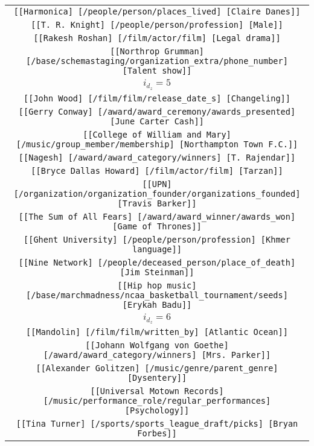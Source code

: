 \begin{longtable}{|c|}
    \texttt{[[Harmonica] [/people/person/places\_lived] [Claire Danes]]}\\
    \texttt{[[T. R. Knight] [/people/person/profession] [Male]]}\\
    \texttt{[[Rakesh Roshan] [/film/actor/film] [Legal drama]]}\\
    \texttt{[[Northrop Grumman] [/base/schemastaging/organization\_extra/phone\_number] [Talent show]]}\\
    \hline 
    \rowcolor[HTML]{EFEFEF} 
    \textsc{$i_{d_z}=5$}\\ \hline 
    \texttt{[[John Wood] [/film/film/release\_date\_s] [Changeling]]}\\
    \texttt{[[Gerry Conway] [/award/award\_ceremony/awards\_presented] [June Carter Cash]]}\\
    \texttt{[[College of William and Mary] [/music/group\_member/membership] [Northampton Town F.C.]]}\\
    \texttt{[[Nagesh] [/award/award\_category/winners] [T. Rajendar]]}\\
    \texttt{[[Bryce Dallas Howard] [/film/actor/film] [Tarzan]]}\\
    \texttt{[[UPN] [/organization/organization\_founder/organizations\_founded] [Travis Barker]]}\\
    \texttt{[[The Sum of All Fears] [/award/award\_winner/awards\_won] [Game of Thrones]]}\\
    \texttt{[[Ghent University] [/people/person/profession] [Khmer language]]}\\
    \texttt{[[Nine Network] [/people/deceased\_person/place\_of\_death] [Jim Steinman]]}\\
    \texttt{[[Hip hop music] [/base/marchmadness/ncaa\_basketball\_tournament/seeds] [Erykah Badu]]}\\
    \hline 
    \rowcolor[HTML]{EFEFEF} 
    \textsc{$i_{d_z}=6$}\\ \hline 
    \texttt{[[Mandolin] [/film/film/written\_by] [Atlantic Ocean]]}\\
    \texttt{[[Johann Wolfgang von Goethe] [/award/award\_category/winners] [Mrs. Parker]]}\\
    \texttt{[[Alexander Golitzen] [/music/genre/parent\_genre] [Dysentery]]}\\
    \texttt{[[Universal Motown Records] [/music/performance\_role/regular\_performances] [Psychology]]}\\
    \texttt{[[Tina Turner] [/sports/sports\_league\_draft/picks] [Bryan Forbes]]}\\

\end{longtable}
